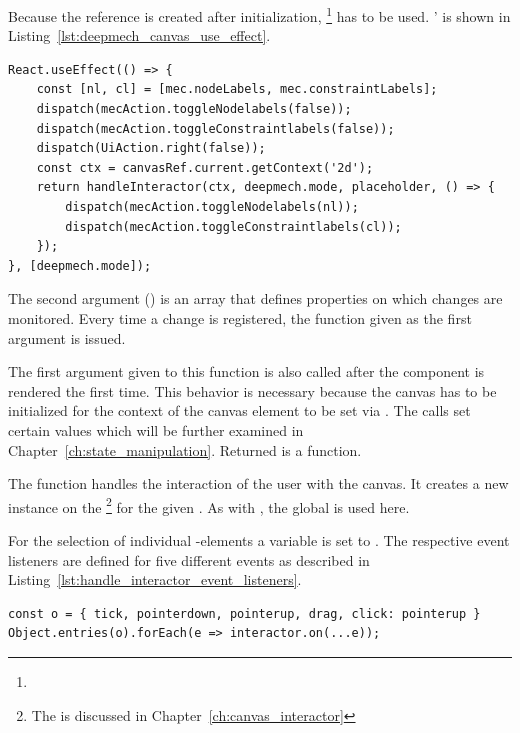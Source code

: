 Because the reference is created after initialization,  \footnote{} has to be used.
'  is shown in Listing~\ref{lst:deepmech_canvas_use_effect}.

\begin{lstlisting}[label={lst:deepmech_canvas_use_effect}, caption={The \code{useEffect} function in the \code{DeepmechCanvas} component.}]
React.useEffect(() => {
    const [nl, cl] = [mec.nodeLabels, mec.constraintLabels];
    dispatch(mecAction.toggleNodelabels(false));
    dispatch(mecAction.toggleConstraintlabels(false));
    dispatch(UiAction.right(false));
    const ctx = canvasRef.current.getContext('2d');
    return handleInteractor(ctx, deepmech.mode, placeholder, () => {
        dispatch(mecAction.toggleNodelabels(nl));
        dispatch(mecAction.toggleConstraintlabels(cl));
    });
}, [deepmech.mode]);
\end{lstlisting}

The second argument () is an array that defines properties on which changes are monitored.
Every time a change is registered, the function given as the first argument is issued.

The first argument given to this function is also called after the component is rendered the first time.
This behavior is necessary because the canvas has to be initialized for the context of the canvas element to be set via .
The  calls set certain values which will be further examined in Chapter~\ref{ch:state_manipulation}.
Returned is a  function.

The  function handles the interaction of the user with the canvas.
It creates a new instance on the \footnote{The  is discussed in Chapter~\ref{ch:canvas_interactor}} for the given .
As with , the global  is used here.

For the selection of individual -elements a  variable is set to .
The respective event listeners are defined for five different events as described in Listing~\ref{lst:handle_interactor_event_listeners}.

\begin{lstlisting}[label={lst:handle_interactor_event_listeners}, caption={Definition of event listeners on the \code{canvasInteractor}.}]
const o = { tick, pointerdown, pointerup, drag, click: pointerup }
Object.entries(o).forEach(e => interactor.on(...e));
\end{lstlisting}

